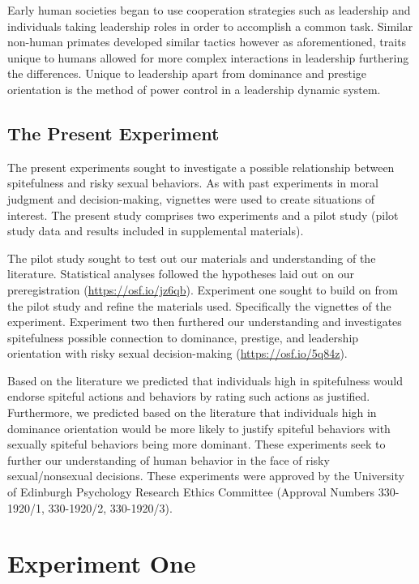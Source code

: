 \documentclass[
  english,
  a4paper,floatsintext]{apa7}
\begin{document}
Early human societies began to use cooperation strategies such as leadership and individuals taking leadership roles in order to accomplish a common task. Similar non-human primates developed similar tactics however as aforementioned, traits unique to humans allowed for more complex interactions in leadership furthering the differences. Unique to leadership apart from dominance and prestige orientation is the method of power control in a leadership dynamic system.

\hypertarget{the-present-experiment}{%
\subsection{The Present Experiment}\label{the-present-experiment}}

The present experiments sought to investigate a possible relationship between spitefulness and risky sexual behaviors. As with past experiments in moral judgment and decision-making, vignettes were used to create situations of interest. The present study comprises two experiments and a pilot study (pilot study data and results included in supplemental materials).

The pilot study sought to test out our materials and understanding of the literature. Statistical analyses followed the hypotheses laid out on our preregistration (\url{https://osf.io/jz6qb}). Experiment one sought to build on from the pilot study and refine the materials used. Specifically the vignettes of the experiment. Experiment two then furthered our understanding and investigates spitefulness possible connection to dominance, prestige, and leadership orientation with risky sexual decision-making (\url{https://osf.io/5q84z}).

Based on the literature we predicted that individuals high in spitefulness would endorse spiteful actions and behaviors by rating such actions as justified. Furthermore, we predicted based on the literature that individuals high in dominance orientation would be more likely to justify spiteful behaviors with sexually spiteful behaviors being more dominant. These experiments seek to further our understanding of human behavior in the face of risky sexual/nonsexual decisions. These experiments were approved by the University of Edinburgh Psychology Research Ethics Committee (Approval Numbers 330-1920/1, 330-1920/2, 330-1920/3).

\hypertarget{experiment-one}{%
\section{Experiment One}\label{experiment-one}}
\end{document}
